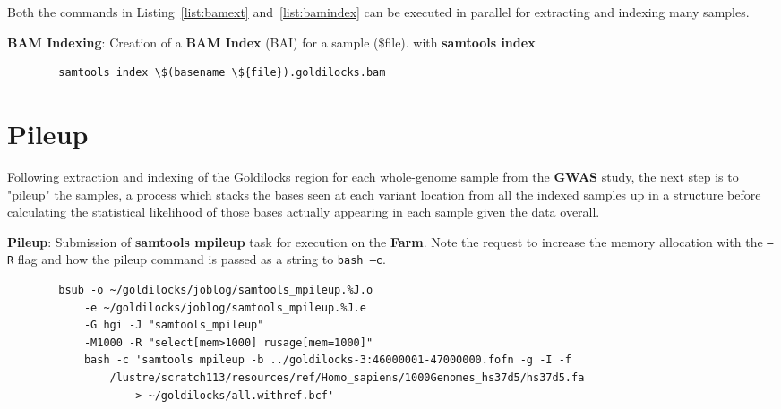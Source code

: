 Both the commands in Listing~\ref{list:bamext} and~\ref{list:bamindex} can
be executed in parallel for extracting and indexing many samples.

\begin{listing}[H]
    \caption[bamindex]{\textbf{BAM Indexing}: Creation of a \textbf{BAM Index} (BAI)
        for a sample (\$file). with \textbf{samtools
    index}\citep{man:samtools}}
    \label{list:bamindex}
    \begin{verbatim}
        samtools index \$(basename \${file}).goldilocks.bam
    \end{verbatim}
\end{listing}



\section{Pileup}

Following extraction and indexing of the Goldilocks region for each whole-genome
sample from the \textbf{GWAS} study, the next step is to "pileup" the samples,
a process which stacks the bases seen at each variant location from all the
indexed samples up in a structure before calculating the statistical likelihood
of those bases actually appearing in each sample given the data overall.

\begin{listing}[H]
    \caption[syn-mpileup]{\textbf{Pileup}: Submission of
        \textbf{samtools mpileup}\citep{samtools-mpileup} task
        for execution on the \textbf{Farm}. Note the request to increase the
        memory allocation with the \texttt{--R} flag and how the pileup command
        is passed as a string to \texttt{bash --c}.}
    \label{list:syn-mpileup}
    \begin{verbatim}
        bsub -o ~/goldilocks/joblog/samtools_mpileup.%J.o
            -e ~/goldilocks/joblog/samtools_mpileup.%J.e
            -G hgi -J "samtools_mpileup"
            -M1000 -R "select[mem>1000] rusage[mem=1000]"
            bash -c 'samtools mpileup -b ../goldilocks-3:46000001-47000000.fofn -g -I -f
                /lustre/scratch113/resources/ref/Homo_sapiens/1000Genomes_hs37d5/hs37d5.fa
                    > ~/goldilocks/all.withref.bcf'
    \end{verbatim}
\end{listing}

